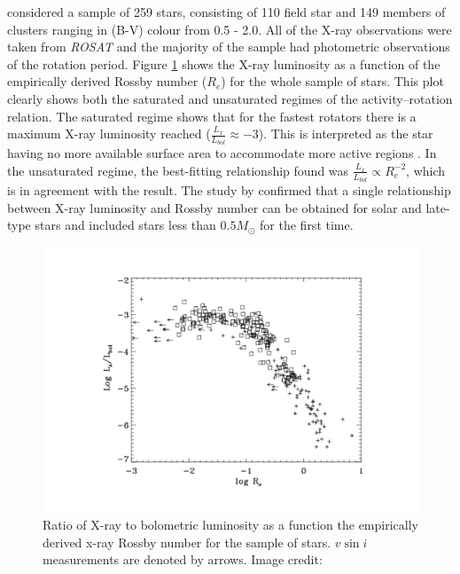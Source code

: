 \citet{Pizzolato_etal_2003} considered a sample of 259 stars, consisting of 110 field star and 149 members of clusters ranging in (B-V) colour from 0.5 - 2.0. All of the X-ray observations were taken from \textit{ROSAT} and the majority of the sample had photometric observations of the rotation period. Figure \ref{fig:pizzolato_etal_2003_plot} shows the X-ray luminosity as a function of the empirically derived Rossby number ($R_{e}$) for the whole sample of stars. This plot clearly shows both the saturated and unsaturated regimes of the activity--rotation relation. The saturated regime shows that for the fastest rotators there is a maximum X-ray luminosity reached ($\frac{L_{x}}{L_{bol}} \approx -3$). This is interpreted as the star having no more available surface area to accommodate more active regions \citep{Jardine_Unruh_1999}. In the unsaturated regime, the best-fitting relationship found was $\frac{L_{x}}{L_{bol}} \propto R_{e}^{-2}$, which is in agreement with the \citet{Pallavicini_etal_1981} result. The study by \citet{Pizzolato_etal_2003} confirmed that a single relationship between X-ray luminosity and Rossby number can be obtained for solar and late-type stars and included stars less than $0.5 M_{\odot}$ for the first time.

\begin{figure}
    \centering
    \includegraphics[scale=0.55]{Figures/2-Historical_overview/p03_fig_9.pdf}
    \caption[activity--rotation relationship from \citet{Pizzolato_etal_2003}]{Ratio of X-ray to bolometric luminosity as a function the empirically derived x-ray Rossby number for the \citet{Pizzolato_etal_2003} sample of stars. $v\sin i$ measurements are denoted by arrows. Image credit: \citet{Pizzolato_etal_2003}}
    \label{fig:pizzolato_etal_2003_plot}
\end{figure}


